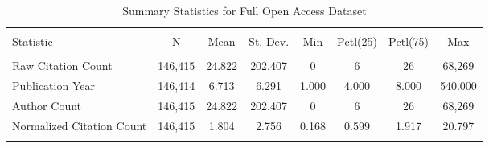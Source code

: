 
\begin{table}[!htbp] \centering 
  \caption{Summary Statistics for Full Open Access Dataset} 
  \label{} 
\begin{tabular}{@{\extracolsep{5pt}}lccccccc} 
\\[-1.8ex]\hline 
\hline \\[-1.8ex] 
Statistic & \multicolumn{1}{c}{N} & \multicolumn{1}{c}{Mean} & \multicolumn{1}{c}{St. Dev.} & \multicolumn{1}{c}{Min} & \multicolumn{1}{c}{Pctl(25)} & \multicolumn{1}{c}{Pctl(75)} & \multicolumn{1}{c}{Max} \\ 
\hline \\[-1.8ex] 
Raw Citation Count & 146,415 & 24.822 & 202.407 & 0 & 6 & 26 & 68,269 \\ 
Publication Year & 146,414 & 6.713 & 6.291 & 1.000 & 4.000 & 8.000 & 540.000 \\ 
Author Count & 146,415 & 24.822 & 202.407 & 0 & 6 & 26 & 68,269 \\ 
Normalized Citation Count & 146,415 & 1.804 & 2.756 & 0.168 & 0.599 & 1.917 & 20.797 \\ 
\hline \\[-1.8ex] 
\end{tabular} 
\end{table} 
